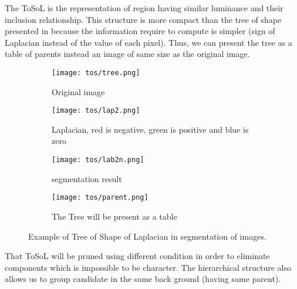 \par
The ToSoL is the representation of region having similar luminance and their inclusion relationship. This structure is more compact than the tree of shape presented in \cite{geraud.13.ismm} because the information require to compute is simpler (sign of Laplacian instead of the value of each pixel). Thus, we can present the tree as a table of parents instead an image of same size as the original image. 

\begin{figure}
	\centering
	\begin{subfigure}[t]{2in}
		\centering
	 	\texttt{[image: tos/tree.png]} \caption{Original image}\label{fig:tosOri} \end{subfigure}   
	\begin{subfigure}[t]{2in}
		\centering
	 	\texttt{[image: tos/lap2.png]} \caption{Laplacian, red is negative, green is positive and blue is zero}\label{fig:tosLap} \end{subfigure}   
	\begin{subfigure}[t]{2in}
		\centering
		\texttt{[image: tos/lab2n.png]} \caption{segmentation result}\label{fig:tosLab} \end{subfigure}
	\centering
		
	\begin{subfigure}[t]{2in}
		\centering
		\texttt{[image: tos/parent.png]} 
		\caption{The Tree will be present as a table}\label{fig:tosParent} \end{subfigure}					
	\centering
	\caption[Example of \textit{Tree of Shape of Laplacian}] {Example of Tree of Shape of Laplacian in segmentation of images.  }
	\label{fig:ToS}
\end{figure}

\par That ToSoL will be pruned using different condition in order to eliminate components which is impossible to be character. The hierarchical structure also allows us to group candidate in the same back ground (having same parent).


